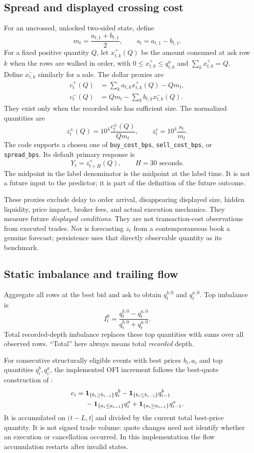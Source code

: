 \subsection{Spread and displayed crossing cost}
For an uncrossed, unlocked two-sided state, define
\[
 m_t=\frac{a_{t,1}+b_{t,1}}{2},\qquad s_t=a_{t,1}-b_{t,1}.
\]
For a fixed positive quantity $Q$, let $x^+_{t,k}(Q)$ be the amount consumed at ask row $k$ when the rows are walked in order, with $0\leq x^+_{t,k}\leq q^a_{t,k}$ and $\sum_kx^+_{t,k}=Q$. Define $x^-_{t,k}$ similarly for a sale. The dollar proxies are
\begin{align}
 c_t^+(Q)&=\sum_k a_{t,k}x^+_{t,k}(Q)-Qm_t,\\
 c_t^-(Q)&=Qm_t-\sum_k b_{t,k}x^-_{t,k}(Q).
\end{align}
They exist only when the recorded side has sufficient size. The normalized quantities are
\begin{equation}
 z_t^{\pm}(Q)=10^4\frac{c_t^{\pm}(Q)}{Qm_t},\qquad
 z_t^{s}=10^4\frac{s_t}{m_t}.\label{eq:costbps}
\end{equation}
The code supports a chosen one of \texttt{buy\_cost\_bps}, \texttt{sell\_cost\_bps}, or \texttt{spread\_bps}. Its default primary response is
\[
 Y_t=z_{t+H}^{+}(Q),\qquad H=30\text{ seconds}.
\]
The midpoint in the label denominator is the midpoint at the label time. It is not a future input to the predictor; it is part of the definition of the future outcome.

These proxies exclude delay to order arrival, disappearing displayed size, hidden liquidity, price impact, broker fees, and actual execution mechanics. They measure future \emph{displayed conditions}. They are not transaction-cost observations from executed trades. Nor is forecasting $z_t$ from a contemporaneous book a genuine forecast; persistence uses that directly observable quantity as its benchmark.

\subsection{Static imbalance and trailing flow}
Aggregate all rows at the best bid and ask to obtain $q_t^{b,0}$ and $q_t^{a,0}$. Top imbalance is
\[
 I_t^0=\frac{q_t^{b,0}-q_t^{a,0}}{q_t^{b,0}+q_t^{a,0}}.
\]
Total recorded-depth imbalance replaces these top quantities with sums over all observed rows. ``Total'' here always means total \emph{recorded} depth.

For consecutive structurally eligible events with best prices $b_i,a_i$ and top quantities $q_i^b,q_i^a$, the implemented OFI increment follows the best-quote construction of \citet{cont2014}:
\begin{align}
 e_i={}&\mathbf 1_{\{b_i\geq b_{i-1}\}}q_i^b-\mathbf 1_{\{b_i\leq b_{i-1}\}}q_{i-1}^b\nonumber\\
 &-\mathbf 1_{\{a_i\leq a_{i-1}\}}q_i^a+\mathbf 1_{\{a_i\geq a_{i-1}\}}q_{i-1}^a.
\end{align}
It is accumulated on $(t-L,t]$ and divided by the current total best-price quantity. It is not signed trade volume: quote changes need not identify whether an execution or cancellation occurred. In this implementation the flow accumulation restarts after invalid states.

